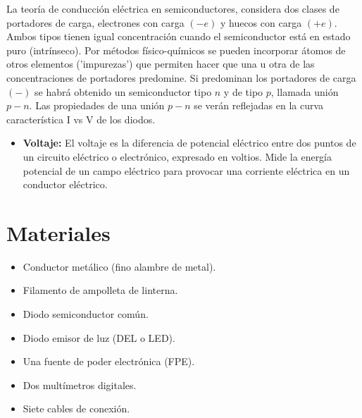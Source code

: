 \documentclass[]{article}
\begin{document}
  La teoría de conducción eléctrica en semiconductores, considera dos clases de portadores de carga, electrones
  con carga $(-e)$ y huecos con carga $(+e)$. Ambos tipos tienen igual concentración cuando el semiconductor está en estado
  puro (intrínseco). Por métodos físico-químicos se pueden incorporar átomos de otros elementos ('impurezas') que permiten
  hacer que una u otra de las concentraciones de portadores predomine. Si predominan los portadores de carga $(-)$ se habrá 
  obtenido un semiconductor tipo $n$ y de tipo $p$, llamada unión $p - n$. Las propiedades de una unión $p-n$ se verán reflejadas en la curva característica
  I vs V de los diodos.

  \begin{itemize}
    \item \textbf{Voltaje\cite{voltaje}: } El voltaje es la diferencia de potencial eléctrico entre dos puntos de un circuito eléctrico o electrónico, expresado en voltios. 
    Mide la energía potencial de un campo eléctrico para provocar una corriente eléctrica en un conductor eléctrico.
  \end{itemize}




\section{Materiales}

  \begin{itemize}
    \item Conductor metálico (fino alambre de metal).
    \item Filamento de ampolleta de linterna.
    \item Diodo semiconductor común.
    \item Diodo emisor de luz (DEL o LED).
    \item Una fuente de poder electrónica (FPE).
    \item Dos multímetros digitales.
    \item Siete cables de conexión.
  \end{itemize}

\end{document}
